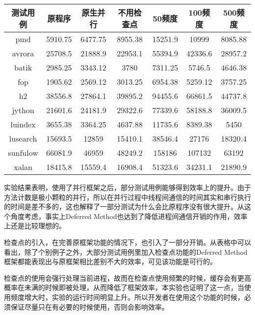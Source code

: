 \begin{table}[!hpb]
	\centering
	\begin{tabular}{c|c|c|c|c|c|c}
		\hline
		测试用例 & 原程序 & 原生并行 & 不用检查点 & 50频度 & 100频度 & 500频度 \\
		\hline
		pmd & 5910.75 & 6477.75 & 8955.38 & 15251.9 & 10999 & 8085.88 \\
		\hline
		avrora & 25708.5 & 21888.9 & 22953.1 & 55394.9 & 42336.6 & 28957.2 \\
		\hline
		batik & 2985.25 & 3343.12 & 3780 & 7311.25 & 5746.5 & 4646.38 \\
		\hline
		fop & 1905.62 & 2569.12 & 3013.25 & 6954.38 & 5259.12 & 3757.25 \\
		\hline
		h2 & 38556.8 & 27864.1 & 39895.2 & 94455.6 & 66861.5 & 44737.8 \\
		\hline
		jython & 21601.6 & 24181.9 & 29322.6 & 77339.6 & 58188.8 & 36009.5 \\
		\hline
		luindex & 3655.38 & 3364.25 & 4637.88 & 11735.6 & 8389.38 & 5450 \\
		\hline
		lusearch & 15693.5 & 12859 & 15410.1 & 38546.4 & 27176 & 18320.4 \\
		\hline
		sunfulow & 66081.9 & 46959 & 48249.2 & 158186 & 107132 & 63192 \\
		\hline
		xalan & 18415.8 & 15559.4 & 16908.4 & 51323.6 & 34231.1 & 21890.9 \\
		\hline
	\end{tabular}
\end{table}

实验结果表明，使用了并行框架之后，部分测试用例能够得到效率上的提升。由于方法计数是极小颗粒的并行，所以在并行过程中线程间通信的时间其实和串行执行的时间是差不多的，这也解释了一部分测试为什么会比原程序没有很大提升。从这个角度考虑，事实上Deferred Method也达到了降低进程间通信开销的作用，效率上还是比较理想的。

检查点的引入，在完善原框架功能的情况下，也引入了一部分开销。从表格中可以看出，除了个别例子之外，大部分测试用例里加入检查点功能的Deferred Method框架都能表现出与原框架相比差别不大的效率，可见该功能是可行的。

检查点的使用会强行处理当前进程，故而在检查点使用频繁的时候，缓存会有更高概率在未满的时候即被处理，从而降低了框架效率，本实验也证明了这一点，当使用频度增大时，实验的运行时间明显上升。所以开发者在使用这个功能的时候，必须保证尽量只在有必要的时候使用，否则会影响效率。

